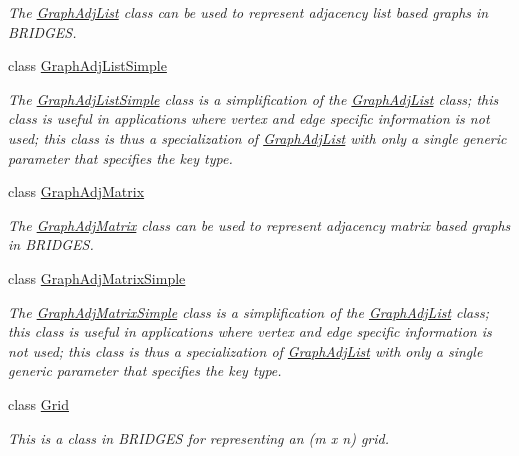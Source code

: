 \begin{DoxyCompactItemize}
\begin{DoxyCompactList}\small\item\em The \mbox{\hyperlink{classbridges_1_1base_1_1_graph_adj_list}{Graph\+Adj\+List}} class can be used to represent adjacency list based graphs in B\+R\+I\+D\+G\+ES. \end{DoxyCompactList}\item 
class \mbox{\hyperlink{classbridges_1_1base_1_1_graph_adj_list_simple}{Graph\+Adj\+List\+Simple}}
\begin{DoxyCompactList}\small\item\em The \mbox{\hyperlink{classbridges_1_1base_1_1_graph_adj_list_simple}{Graph\+Adj\+List\+Simple}} class is a simplification of the \mbox{\hyperlink{classbridges_1_1base_1_1_graph_adj_list}{Graph\+Adj\+List}} class; this class is useful in applications where vertex and edge specific information is not used; this class is thus a specialization of \mbox{\hyperlink{classbridges_1_1base_1_1_graph_adj_list}{Graph\+Adj\+List}} with only a single generic parameter that specifies the key type. \end{DoxyCompactList}\item 
class \mbox{\hyperlink{classbridges_1_1base_1_1_graph_adj_matrix}{Graph\+Adj\+Matrix}}
\begin{DoxyCompactList}\small\item\em The \mbox{\hyperlink{classbridges_1_1base_1_1_graph_adj_matrix}{Graph\+Adj\+Matrix}} class can be used to represent adjacency matrix based graphs in B\+R\+I\+D\+G\+ES. \end{DoxyCompactList}\item 
class \mbox{\hyperlink{classbridges_1_1base_1_1_graph_adj_matrix_simple}{Graph\+Adj\+Matrix\+Simple}}
\begin{DoxyCompactList}\small\item\em The \mbox{\hyperlink{classbridges_1_1base_1_1_graph_adj_matrix_simple}{Graph\+Adj\+Matrix\+Simple}} class is a simplification of the \mbox{\hyperlink{classbridges_1_1base_1_1_graph_adj_list}{Graph\+Adj\+List}} class; this class is useful in applications where vertex and edge specific information is not used; this class is thus a specialization of \mbox{\hyperlink{classbridges_1_1base_1_1_graph_adj_list}{Graph\+Adj\+List}} with only a single generic parameter that specifies the key type. \end{DoxyCompactList}\item 
class \mbox{\hyperlink{classbridges_1_1base_1_1_grid}{Grid}}
\begin{DoxyCompactList}\small\item\em This is a class in B\+R\+I\+D\+G\+ES for representing an (m x n) grid. \end{DoxyCompactList}\item 

\end{DoxyCompactItemize}
